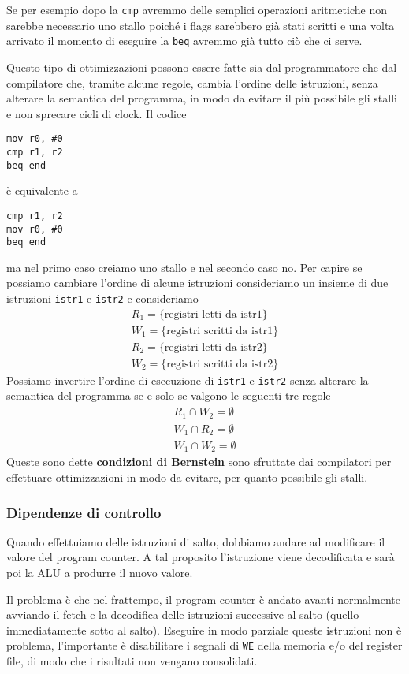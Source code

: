 Se per esempio dopo la \verb|cmp| avremmo delle semplici operazioni aritmetiche non sarebbe
necessario uno stallo poiché i flags sarebbero già stati scritti e una volta arrivato il momento di
eseguire la \verb|beq| avremmo già tutto ciò che ci serve.

Questo tipo di ottimizzazioni possono essere fatte sia dal programmatore che dal compilatore che,
tramite alcune regole, cambia l'ordine delle istruzioni, senza alterare la semantica del programma,
in modo da evitare il più possibile gli stalli e non sprecare cicli di clock. Il codice
\begin{verbatim}
mov r0, #0
cmp r1, r2
beq end
\end{verbatim}
è equivalente a
\begin{verbatim}
cmp r1, r2
mov r0, #0
beq end
\end{verbatim}
ma nel primo caso creiamo uno stallo e nel secondo caso no. Per capire se possiamo cambiare
l'ordine di alcune istruzioni consideriamo un insieme di due istruzioni \verb|istr1| e \verb|istr2|
e consideriamo
\begin{gather*}
	R_1 = \{ \text{registri letti da istr1} \} \\
	W_1 = \{ \text{registri scritti da istr1} \} \\
	R_2 = \{ \text{registri letti da istr2} \} \\
	W_2 = \{ \text{registri scritti da istr2} \}
\end{gather*}
Possiamo invertire l'ordine di esecuzione di \verb|istr1| e \verb|istr2| senza alterare la
semantica del programma se e solo se valgono le seguenti tre regole
\begin{gather*}
	R_1 \cap W_2 = \emptyset \\
	W_1 \cap R_2 = \emptyset \\
	W_1 \cap W_2 = \emptyset
\end{gather*}
Queste sono dette \textbf{condizioni di Bernstein} sono sfruttate dai compilatori per effettuare
ottimizzazioni in modo da evitare, per quanto possibile gli stalli.

\subsubsection{Dipendenze di controllo}
Quando effettuiamo delle istruzioni di salto, dobbiamo andare ad modificare il valore del program
counter. A tal proposito l'istruzione viene decodificata e sarà poi la ALU a produrre il nuovo
valore.

Il problema è che nel frattempo, il program counter è andato avanti normalmente avviando il fetch e
la decodifica delle istruzioni successive al salto (quello immediatamente sotto al salto). Eseguire
in modo parziale queste istruzioni non è problema, l'importante è disabilitare i segnali di
\verb|WE| della memoria e/o del register file, di modo che i risultati non vengano consolidati.

